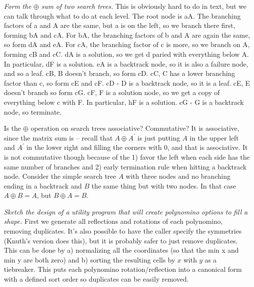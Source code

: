  {\it Form the $\oplus$ sum of two search trees.}\hfil\break
This is obviously hard to do in text, but we can talk through what to do at
each level.
\vskip 0.05in
\noindent The root node is aA.\hfil\break
\noindent The branching factors of a and A are the same, but a is on the
left, so we branch there first, forming bA and cA.
\noindent For bA, the branching factors of b and A are again the same, so form
dA and eA.\hfil\break
\noindent For cA, the branching factor of c is more, so we branch on A, forming
cB and cC.\hfil\break
\noindent dA is a solution, so we get d paried with everything below A. In 
particular, dF is a solution.\hfil\break
\noindent eA is a backtrack node, so it is also a failure node, and so a leaf.
\hfil\break
\noindent cB, B doesn't branch, so form cD.\hfil\break
\noindent cC, C has a lower branching factor than c, so form cE and cF.\hfil\break
\noindent cD - D is a backtrack node, so it is a leaf.\hfil\break
\noindent cE, E doesn't branch so form cG.\hfil\break
\noindent cF, F is a solution node, so we get a copy of everything below c
with F.  In particular, hF is a solution.\hfil\break
\noindent cG - G is a backtrack node, so terminate.\hfil\break

 {Is the $\oplus$ operation on search trees associative?
Commutative?}\hfil\break
It is associative, since the matrix sum is -- recall that $A \oplus A^{\prime}$
is just putting $A$ in the upper left and $A^{\prime}$ in the lower right and
filling the corners with 0, and that is associative.  It is not commutative
though because of the 1) favor the left when each side has the same number
of branches and 2) early termination rule when hitting a backtrack node.
Consider the simple search tree $A$ with three nodes and no branching ending
in a backtrack and $B$ the same thing but with two nodes.  In that case
$A \oplus B = A$, but $B \oplus A = B$.

 {\it Sketch the design of a utility program that will
create polynomino options to fill a shape.}\hfil\break
First we generate all reflections and rotations of each polynomino, removing
duplicates.  It's also possible to have the caller specify the symmetries
(Knuth's version does this), but it is probably safer to just remove duplicates.
This can be done by a) normalizing all the coordinates (so that the min x and
min y are both zero) and b) sorting the resulting cells by $x$ with $y$ as a
tiebreaker.  This puts each polynomino rotation/reflection into a canonical
form with a defined sort order so duplicates can be easily removed.

